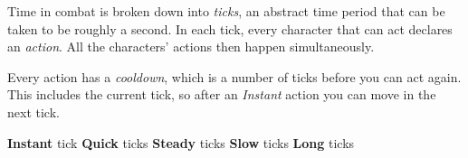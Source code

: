 
Time in combat is broken down into \emph{ticks}, an abstract time period that can be taken to be roughly a second. In each tick, every character that can act declares an \emph{action}. All the characters' actions then happen simultaneously.

Every action has a \emph{cooldown}, which is a number of ticks before you can act again. This includes the current tick, so after an \emph{Instant} action you can move in the next tick.

{\footnotesize
  \textbf{Instant} \hnspace \durationInstant{} tick  \hfill
  \textbf{Quick}   \hnspace \durationQuick{}   ticks \hfill
  \textbf{Steady}  \hnspace \durationSteady{}  ticks \hfill
  \textbf{Slow}    \hnspace \durationSlow{}    ticks \hfill
  \textbf{Long}    \hnspace \durationLong{}    ticks \hspace*{-5ex} %
}
